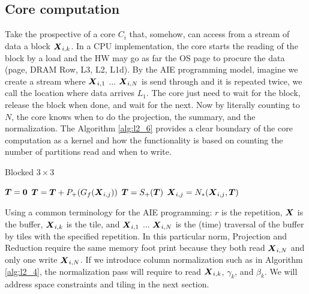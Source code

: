 \documentclass[acmsmall]{acmart}
\begin{document}
\subsection{Core computation}
Take the prospective of a core $C_i$ that, somehow, can access from a
stream of data a block ${\boldsymbol X_{i,k}}$. In a CPU implementation, the
core starts the reading of the block by a load and the HW may go as
far the OS page to procure the data (page, DRAM Row, L3, L2, L1d). By
the AIE programming model, imagine we create a stream where
${\boldsymbol X_{i,1}}$ ... ${\boldsymbol X_{i,N}}$ is send through and it is repeated
twice, we call the location where data arrives $L_1$.  The core just
need to wait for the block, release the block when done, and wait for
the next. Now by literally counting to $N$, the core knows when to do
the projection, the summary, and the normalization. The Algorithm
\ref{alg:l2_6} provides a clear boundary of the core computation as a
kernel and how the functionality is based on counting the number of
partitions read and when to write.


{\small \begin{algorithm}
    \caption{Blocked $3\times 3$}
    \label{alg:l2_6}
    \begin{algorithmic}
          
             \STATE {} 
             \STATE ${\boldsymbol T} = {\boldsymbol 0} $  
             \STATE ${\boldsymbol T} = {\boldsymbol T} +P_+(G_{f}({\boldsymbol X}_{i,j}))$  
             \STATE ${\boldsymbol T}  =   S_+({\boldsymbol T})$      
             \ELSE
             \STATE $ {\boldsymbol X}_{i,j} = N_*({\boldsymbol X}_{i,j},{\boldsymbol T})$
             \ENDIF
         \ENDWHILE
      \ENDWHILE
    \end{algorithmic}
\end{algorithm} }

Using a common terminology for the AIE programming: $r$ is the
repetition, ${\boldsymbol X}$ is the buffer, ${\boldsymbol X}_{i,k}$ is the tile, and
${\boldsymbol X_{i,1}}$ ... ${\boldsymbol X_{i,N}}$ is the (time) traversal of the
buffer by tiles with the specified repetition. In this particular
norm, Projection and Reduction require the same memory foot print
because they both read ${\boldsymbol X_{i,N}}$ and only one write
${\boldsymbol X_{i,N}}$. If we introduce column normalization such as in
Algorithm \ref{alg:l2_4}, the normalization pass will require to read
${\boldsymbol X_{i,k}}$, $\gamma_k$, and $\beta_k$. We will address space
constraints and tiling in the next section.
\end{document}
